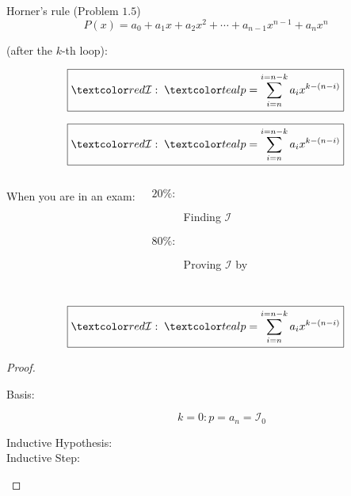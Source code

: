 
\begin{frame}{}
  \centerline{\Large {}}

\end{frame}

\begin{frame}{}
  \begin{exampleblock}{Horner's rule (Problem $1.5$)}
    \[
      P(x) = a_0 + a_1 x + a_2 x^2 + \cdots + a_{n-1} x^{n-1} + a_n x^n
    \]

    
  \end{exampleblock}

  \pause
  \vspace{0.50cm}
  \centerline{ (after the $k$-th loop):}
  \pause
  \[
    \boxed{\red{\mathcal{I}:}\;\; \teal{p = \sum_{i = n}^{i = n-k} a_i x^{k-(n-i)}}}
  \]
\end{frame}

\begin{frame}{}
  \[
    \boxed{\red{\mathcal{I}:}\;\; \teal{p = \sum_{i = n}^{i = n-k} a_i x^{k-(n-i)}}}
  \]

  \vspace{0.50cm}
  \begin{columns}
      \pause
      \qquad When you are in an exam:\\[5pt]
      \begin{description}
	\item[$20\%:$] Finding $\mathcal{I}$
	\item[$80\%:$] Proving $\mathcal{I}$ by 
      \end{description}
  \end{columns}
\end{frame}

\begin{frame}{}
  \[
    \boxed{\red{\mathcal{I}:}\;\; \teal{p = \sum_{i = n}^{i = n-k} a_i x^{k-(n-i)}}}
  \]

  \vspace{0.30cm}
  \begin{proof}
    \begin{center}
    \end{center}
    \pause
    \begin{description}
      \item[Basis:]
	\[
	  k = 0: p = a_n = \mathcal{I}_0
	\]
      \item[Inductive Hypothesis:]
      \item[Inductive Step:]
    \end{description}
  \end{proof}
\end{frame}


